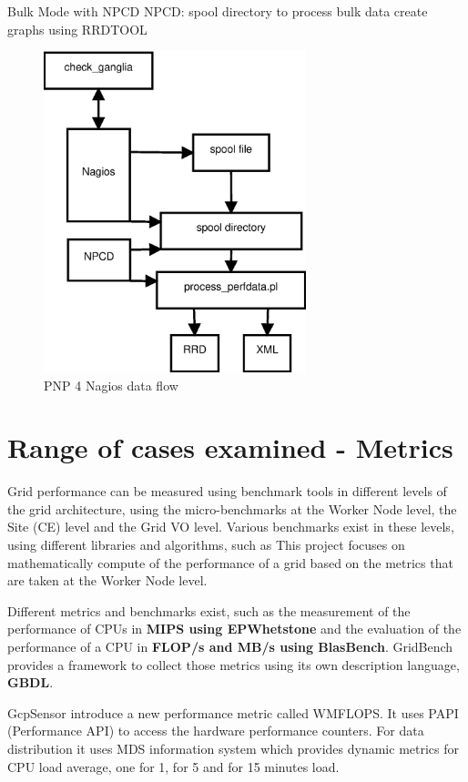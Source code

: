 Bulk Mode with NPCD
NPCD:
spool directory to process bulk data
create graphs using RRDTOOL

\begin{figure}[htb]
\centering
 \includegraphics[width=3in]{images/npcd_pnp4nagios.eps}
\caption{PNP 4 Nagios data flow}
\label{figure:pnp4nagios}
\end{figure}
\newpage

\section{Range of cases examined - Metrics}

Grid performance can be measured using benchmark tools in different levels of
the grid architecture, using the micro-benchmarks at the Worker Node level, the
Site (CE) level and the Grid VO level. Various benchmarks exist in these
levels, using different libraries and algorithms, such as  This project focuses
on mathematically compute of the performance of a grid based on the metrics that
are taken at the Worker Node level.

Different metrics and benchmarks exist, such as the measurement of
the performance of CPUs in {\bf MIPS using EPWhetstone} and the evaluation of
the performance of a CPU in {\bf FLOP/s and MB/s using BlasBench}. GridBench
\cite{gridbench} provides a framework to collect those metrics using its own
description language, {\bf GBDL}.

GcpSensor \cite{gcpsensor} introduce a new performance metric called WMFLOPS. It
uses PAPI \cite{papi} (Performance API) to access the hardware performance
counters. For data distribution it uses MDS information system which provides
dynamic metrics for CPU load average, one for 1, for 5 and for 15 minutes load.
\newpage

